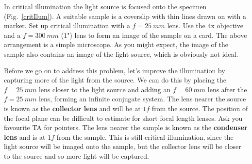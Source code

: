 \documentclass[a4paper]{report}
\newcommand{\nexercise}[0]{\arabic{exercises}\addtocounter{exercises}{1}}
\begin{document}
\begin{exercisebox}[frametitle={Exercise \nexercise: Critical illumination}]
In critical illumination the light source is focused onto the specimen (Fig.~\ref{critIlum}).
A suitable sample is a coverslip with thin lines drawn on with a marker.
Set up critical illumination with a $f=25~mm$ lens. Use the 4x objective and a $f=300~mm$ (1") lens to form an image of the sample on a card.
The above arrangement is a simple microscope. 
As you might expect, the image of the sample also contains an image of the light source, which is obviously not ideal.

Before we go on to address this problem, let's improve the illumination by capturing more of the light from the source. 
We can do this by placing the $f=25~mm$ lens closer to the light source and adding an $f=60~mm$ lens after the $f=25~mm$ lens, forming an infinite conjugate system. 
The lens nearer the source is known as the \textbf{collector lens} and will be at $1f$ from the source. The position of the focal plane can be difficult to estimate for short focal length lenses. Ask you favourite TA for pointers.
The lens nearer the sample is known as the \textbf{condenser lens} and is at $1f$ from the sample. 
This is still critical illumination, since the light source will be imaged onto the sample, but the collector lens will be closer to the source and so more light will be captured.
\end{exercisebox}
\end{document}
